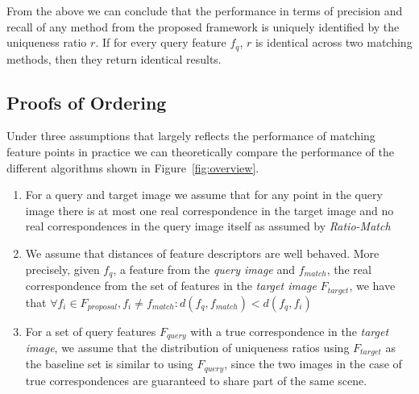 \documentclass[journal]{IEEEtran}
\begin{document}
From the above we can conclude that the performance in terms of 
precision and recall of any method from the proposed framework is 
uniquely identified by the uniqueness ratio $r$.  If for every query 
feature $f_{q}$, $r$ is identical across two matching methods, then they 
return identical results. 

\subsection{Proofs of Ordering}

Under three assumptions that largely reflects the performance of 
matching feature points in practice we can theoretically compare the 
performance of the different algorithms shown in 
Figure~\ref{fig:overview}.

\begin{enumerate}
    \item{For a query and target image we assume that for any point in 
        the query image there is at most one real correspondence in the 
    target image and no real correspondences in the query image itself 
as assumed by \emph{Ratio-Match}}
    \item{We assume that distances of feature descriptors are well 
            behaved.  More precisely, given $f_q$, a feature from the 
            \emph{query image} and $f_{match}$, the real correspondence 
            from the set of features in the \emph{target image} 
            $F_{target}$, we have that $\forall f_i \in F_{proposal}, 
            f_i \neq f_{match}: d(f_q,f_{match}) < d(f_q, f_i)$}
     \item{For a set of query features $F_{query}$ with a true 
             correspondence in the \emph{target image}, we assume that 
             the distribution of uniqueness ratios using $F_{target}$ as 
             the baseline set is similar to using $F_{query}$, since the 
         two images in the case of true correspondences are guaranteed 
     to share part of the same scene.}
    \end{enumerate}
\end{document}
